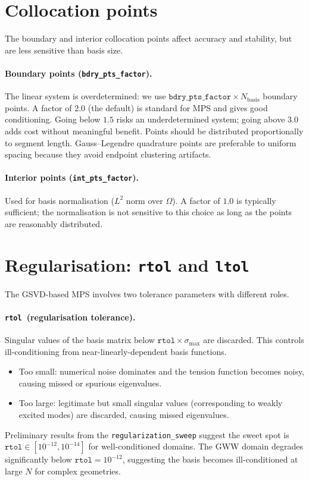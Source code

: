 \documentclass[11pt]{article}
\newcommand{\Nbasis}{N_{\mathrm{basis}}}
\newcommand{\rtol}{\texttt{rtol}}
\begin{document}
\section{Collocation points}

The boundary and interior collocation points affect accuracy and stability, but
are less sensitive than basis size.

\paragraph{Boundary points (\texttt{bdry\_pts\_factor}).}
The linear system is overdetermined: we use
$\texttt{bdry\_pts\_factor}\times\Nbasis$ boundary points.  A factor of $2.0$
(the default) is standard for MPS and gives good conditioning.  Going below
$1.5$ risks an underdetermined system; going above $3.0$ adds cost without
meaningful benefit.  Points should be distributed proportionally to segment
length.  Gauss--Legendre quadrature points are preferable to uniform spacing
because they avoid endpoint clustering artifacts.

\paragraph{Interior points (\texttt{int\_pts\_factor}).}
Used for basis normalisation ($L^2$ norm over $\Omega$).  A factor of $1.0$ is
typically sufficient; the normalisation is not sensitive to this choice as long
as the points are reasonably distributed.

\section{Regularisation: \texttt{rtol} and \texttt{ltol}}

The GSVD-based MPS involves two tolerance parameters with different roles.

\paragraph{\rtol\ (regularisation tolerance).}
Singular values of the basis matrix below $\rtol\times\sigma_{\max}$ are
discarded.  This controls ill-conditioning from near-linearly-dependent basis
functions.
\begin{itemize}
  \item Too small: numerical noise dominates and the tension function becomes
    noisy, causing missed or spurious eigenvalues.
  \item Too large: legitimate but small singular values (corresponding to weakly
    excited modes) are discarded, causing missed eigenvalues.
\end{itemize}
Preliminary results from the \texttt{regularization\_sweep} suggest the sweet
spot is $\rtol\in[10^{-12},10^{-14}]$ for well-conditioned domains.  The GWW
domain degrades significantly below $\rtol=10^{-12}$, suggesting the basis
becomes ill-conditioned at large $N$ for complex geometries.
\end{document}
